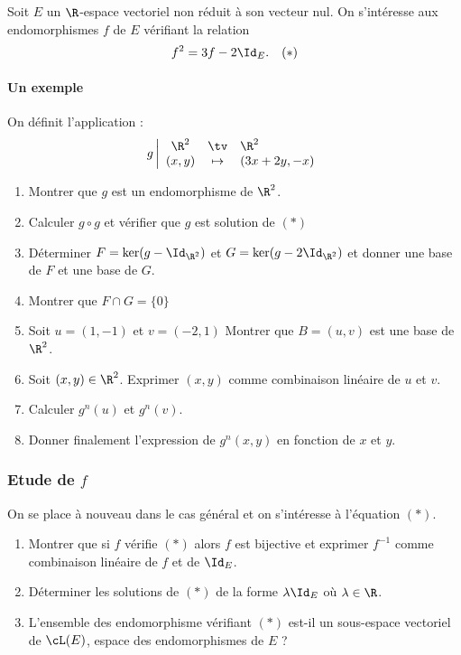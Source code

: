Soit $E$ un  $\R$-espace vectoriel non réduit à son vecteur nul. On s'intéresse aux endomorphismes $f$ de $E$ vérifiant la relation 
$$f^2 =3f - 2\Id_E.\quad (*) $$
\paragraph{Un exemple}



On définit l'application : 
$$g \left| \begin{array}{ccl}
\R^2 &\tv& \R^2 \\
(x,y) &\mapsto & (3x+2y, -x)
\end{array}\right.$$
\begin{enumerate}
\item Montrer que $g$ est un endomorphisme de $\R^2$.
\item Calculer $g\circ g$ et vérifier que $g$ est solution de $(*)$
\item Déterminer $F =\ker(g-\Id_{\R^2}) $ et $G =\ker(g- 2\Id_{\R^2}) $ et donner une base de $F$ et une base de $G$. 
\item Montrer que $F \cap G= \{ 0\}$ 
\item Soit $u =(1,-1) $ et  $v= (-2 , 1) $ Montrer que $B=(u,v) $ est une base de $\R^2$.
\item Soit $(x,y)\in \R^2$. Exprimer $(x,y) $ comme combinaison linéaire de $u$ et $v$.
\item Calculer $g^n(u)$ et $g^n(v)$. 
\item Donner finalement  l'expression de $g^n(x,y) $ en fonction de $x$ et $y$. 

\end{enumerate}
\subsubsection{Etude de $f$}
On se place à nouveau dans le cas général et on s'intéresse à l'équation $(*)$.
\begin{enumerate}
\item Montrer que si $f$ vérifie $(*)$ alors $f$ est bijective et exprimer $f^{-1}$ comme combinaison linéaire de $f$ et de $ \Id_E$. 
\item Déterminer les solutions de $(*)$ de la forme $\lambda \Id_E$ où $\lambda \in \R$. 
\item L'ensemble des endomorphisme vérifiant $(*)$ est-il un sous-espace vectoriel de $\cL(E)$, espace des endomorphismes de $E$ ? 
\end{enumerate}


